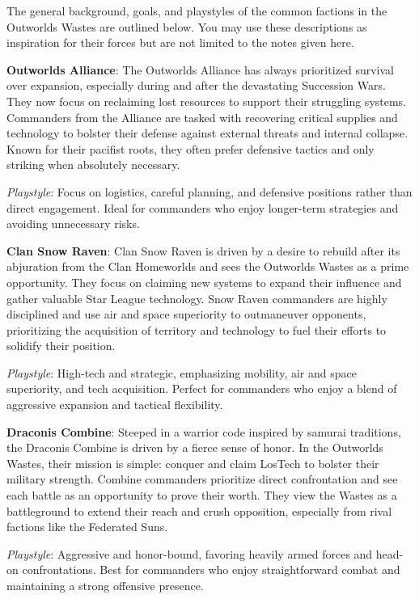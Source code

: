 The general background, goals, and playstyles of the common factions in the Outworlds Wastes are outlined below.
You may use these descriptions as inspiration for their forces but are not limited to the notes given here.

{\bfseries Outworlds Alliance}:
The Outworlds Alliance has always prioritized survival over expansion, especially during and after the devastating Succession Wars.
They now focus on reclaiming lost resources to support their struggling systems.
Commanders from the Alliance are tasked with recovering critical supplies and technology to bolster their defense against external threats and internal collapse.
Known for their pacifist roots, they often prefer defensive tactics and only striking when absolutely necessary.

\emph{Playstyle}:
Focus on logistics, careful planning, and defensive positions rather than direct engagement.
Ideal for commanders who enjoy longer-term strategies and avoiding unnecessary risks.

{\bfseries Clan Snow Raven}:
Clan Snow Raven is driven by a desire to rebuild after its abjuration from the Clan Homeworlds and sees the Outworlds Wastes as a prime opportunity.
They focus on claiming new systems to expand their influence and gather valuable Star League technology.
Snow Raven commanders are highly disciplined and use air and space superiority to outmaneuver opponents, prioritizing the acquisition of territory and technology to fuel their efforts to solidify their position.

\emph{Playstyle}:
High-tech and strategic, emphasizing mobility, air and space superiority, and tech acquisition.
Perfect for commanders who enjoy a blend of aggressive expansion and tactical flexibility.

{\bfseries Draconis Combine}:
Steeped in a warrior code inspired by samurai traditions, the Draconis Combine is driven by a fierce sense of honor.
In the Outworlds Wastes, their mission is simple: conquer and claim LosTech to bolster their military strength.
Combine commanders prioritize direct confrontation and see each battle as an opportunity to prove their worth.
They view the Wastes as a battleground to extend their reach and crush opposition, especially from rival factions like the Federated Suns.

\emph{Playstyle}:
Aggressive and honor-bound, favoring heavily armed forces and head-on confrontations.
Best for commanders who enjoy straightforward combat and maintaining a strong offensive presence.


